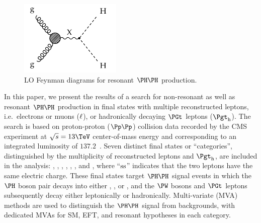 \begin{figure}[h!]
\setlength{\unitlength}{1mm}
\begin{center}
\includegraphics*[height=36mm]{figures/ggHH_resonant.pdf}
\end{center}
\caption{
  LO Feynman diagrams for resonant $\HH$ production.
}
\label{fig:Feynman_ggHH_resonant}
\end{figure}

In this paper, we present the results of a search for non-resonant as well as resonant $\HH$ production
in final states with multiple reconstructed leptons, i.e.\ electrons or muons ($\Plepton$), or hadronically decaying $\PGt$ leptons ($\tauh$).
The search is based on proton-proton ($\Pp\Pp$) collision data recorded by the CMS experiment at $\sqrt{s} = 13\TeV$ center-of-mass energy
and corresponding to an integrated luminosity of $137.2$~\fbinv.
Seven distinct final states or ``categories'', distinguished by the multiplicity of reconstructed leptons and $\tauh$, are included in the analysis:
\twoLeptonssZeroTau, \threeLeptonZeroTau, \fourLeptonZeroTau, \threeLeptonOneTau, \twoLeptonTwoTau, \oneLeptonThreeTau, and \zeroLeptonFourTau,
where ``$\ss$'' indicates that the two leptons have the same electric charge. 
These final states target $\HH$ signal events in which the $\PHiggs$ boson pair decays into either \WWWW, \WWtt, or \tttt,
and the $\PW$ bosons and $\PGt$ leptons subsequently decay either leptonically or hadronically.
Multi-variate (MVA) methods are used to distinguish the $\HH$ signal from backgrounds,
with dedicated MVAs for SM, EFT, and resonant hypotheses in each category.

